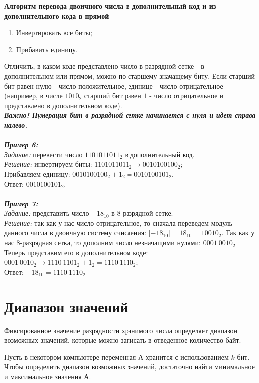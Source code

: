 \begin{center}
  \textbf{Алгоритм перевода двоичного числа в дополнительный код и из дополнительного кода в прямой}
\end{center}
\begin{enumerate}
\item Инвертировать все биты;
\item Прибавить единицу.
\end{enumerate}

Отличить, в каком коде представлено число в разрядной сетке - в дополнительном или прямом, можно по старшему значащему биту. Если старший бит равен нулю - число положительное, единице - число отрицательное (например, в числе $1010_{2}$ старший бит равен $1$ - число отрицательное и представлено в дополнительном коде).
\\\textbf{\emph{Важно! Нумерация бит в разрядной сетке начинается с нуля и идет справа налево.}}
\\
\\\emph{\textbf{Пример 6:}}
\\\emph{Задание:} перевести число $1101011011_{2}$ в дополнительный код.
\\\emph{Решение:} инвертируем биты: $1101011011_{2} \to 0010100100_{2}$;
\\Прибавляем единицу: $0010100100_{2} + 1_{2} = 0010100101_{2}$.
\\Ответ: $0010100101_{2}$.
\\
\\\emph{\textbf{Пример 7:}}
\\\emph{Задание:} представить число $-18_{10}$ в 8-разрядной сетке.
\\\emph{Решение:} так как у нас число отрицательное, то сначала переведем модуль данного числа в двоичную систему счисления: $|-18_{10}| = 18_{10} = 10010_{2}$.
Так как у нас 8-разрядная сетка, то дополним число незначащими нулями: $0001\ 0010_{2}$
Теперь представим его в дополнительном коде: $0001\ 0010_{2} \to 1110\ 1101_{2} + 1_{2} = 1110\ 1110_{2}$;\\
Ответ: $-18_{10} = 1110\ 1110_{2}$

\section{Диапазон значений}
Фиксированное значение разрядности хранимого числа определяет диапазон возможных значений, которые можно записать в отведенное количество байт.

Пусть в некотором компьютере переменная А хранится с использованием $k$ бит. Чтобы определить диапазон возможных значений, достаточно найти минимальное и максимальное значения А. 

